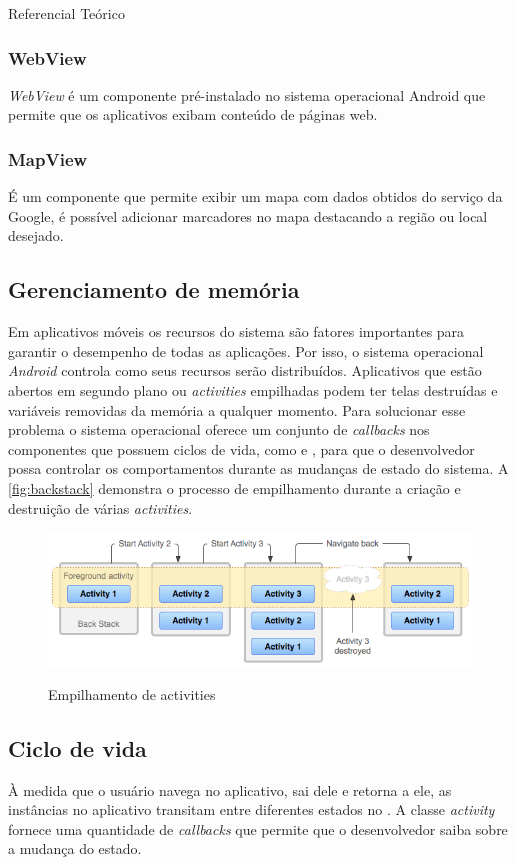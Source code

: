 \documentclass[
	12pt,				%
	openany,			%
	twoside,			%
	a4paper,			%
	english,			%
	french,				%
	spanish,			%
	brazil				%
	]{abntex2}
\begin{document}
\begin{chapter}{Referencial Teórico}
\subsubsection{WebView} \label{WebView}
\textit{WebView} é um componente pré-instalado no sistema operacional Android que permite que os aplicativos exibam conteúdo de páginas web.

\subsubsection{MapView} \label{MapView}
É um componente que permite exibir um mapa com dados obtidos do serviço da Google, é possível adicionar marcadores no mapa destacando a região ou local desejado.


\newpage
\subsection{Gerenciamento de memória}
Em aplicativos móveis os recursos do sistema são fatores importantes para garantir o desempenho de todas as aplicações. Por isso, o sistema operacional \textit{Android} controla como seus recursos serão distribuídos. Aplicativos que estão abertos em segundo plano ou \textit{activities} empilhadas podem ter telas destruídas e variáveis removidas da memória a qualquer momento. Para solucionar esse problema o sistema operacional oferece um conjunto de \textit{callbacks} nos componentes que possuem ciclos de vida, como  e , para que o desenvolvedor possa controlar os comportamentos durante as mudanças de estado do sistema. A \autoref{fig:backstack} demonstra o processo de empilhamento durante a criação e destruição de várias \textit{activities}.

\begin{figure}[h]
\centering
   \caption{Empilhamento de activities}
   \includegraphics[scale=0.70]{media/diagram_backstack.png}
     \label{fig:backstack}
\end{figure}

\subsection{Ciclo de vida}
À medida que o usuário navega no aplicativo, sai dele e retorna a ele, as instâncias  no aplicativo transitam entre diferentes estados no . A classe \textit{activity} fornece uma quantidade de \textit{callbacks} que permite que o desenvolvedor saiba sobre a mudança do estado.


\end{chapter}
\end{document}
